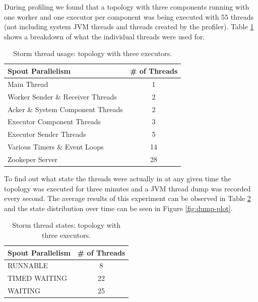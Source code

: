 \documentclass[bsc,deptreport,twoside,singlespacing,normalheadings,parskip]{infthesis}\usepackage[]{graphicx}\usepackage[]{color}
\begin{document}
During profiling we found that a topology with three components running with one worker and one executor per component was being executed with 55 threads (not including system JVM threads and threads created by the profiler). Table \ref{table:breakdown} shows a breakdown of what the individual threads were used for.

\begin{table}[htb!]
\centering
\small
\begin{tabular}{@{}lc@{}}
    \textbf{Spout Parallelism} & \textbf{\# of Threads} \\ \toprule
    Main Thread & 1  \\
	Worker Sender \& Receiver Threads & 2  \\
    Acker \& System Component Threads & 2  \\
    Executor Component Threads & 3  \\
    Executor Sender Threads & 5  \\
    Various Timers \& Event Loops & 14  \\
    Zookeper Server & 28  \\
\end{tabular}
\caption[Storm thread usage.]{Storm thread usage: topology with three executors.}
\label{table:breakdown}
\end{table}

To find out what state the threads were actually in at any given time the topology was executed for three minutes and a JVM thread dump was recorded every second. The average results of this experiment can be observed in Table \ref{table:dump} and the state distribution over time can be seen in Figure \ref{fig:dump-plot}.

\begin{table}[htb!]
\centering
\small
\begin{tabular}{@{}lc@{}}
    \textbf{Spout Parallelism} & \textbf{\# of Threads} \\ \toprule
    RUNNABLE & 8  \\
	TIMED WAITING & 22  \\
    WAITING & 25  \\
\end{tabular}
\caption[Storm thread states.]{Storm thread states: topology with three executors.}
\label{table:dump}
\end{table}
\end{document}
